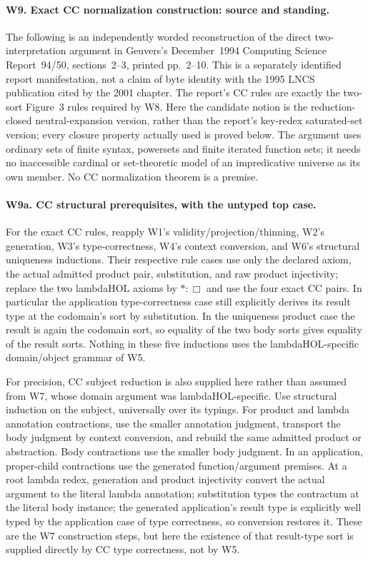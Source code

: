 \paragraph{W9. Exact CC normalization construction: source and standing.}
The following is an independently worded reconstruction of the direct
two-interpretation argument in Geuvers's December~1994 Computing Science
Report~94/50, sections~2--3, printed pp.~2--10. This is a separately
identified report manifestation, not a claim of byte identity with the
1995 LNCS publication cited by the 2001 chapter. The report's CC rules
are exactly the two-sort Figure~3 rules required by W8. Here the
candidate notion is the reduction-closed neutral-expansion version,
rather than the report's key-redex saturated-set version; every closure
property actually used is proved below. The argument uses ordinary sets
of finite syntax, powersets and finite iterated function sets; it needs
no inaccessible cardinal or set-theoretic model of an impredicative
universe as its own member. No CC normalization theorem is a premise.

\paragraph{W9a. CC structural prerequisites, with the untyped top case.}
For the exact CC rules, reapply W1's validity/projection/thinning,
W2's generation, W3's type-correctness, W4's context conversion, and
W6's structural uniqueness inductions. Their respective rule cases use
only the declared axiom, the actual admitted product pair, substitution,
and raw product injectivity; replace the two lambdaHOL axioms by
\(\ast:\Box\) and use the four exact CC pairs. In particular the
application type-correctness case still explicitly derives its result
type at the codomain's sort by substitution. In the uniqueness product
case the result is again the codomain sort, so equality of the two body
sorts gives equality of the result sorts. Nothing in these five inductions
uses the lambdaHOL-specific domain/object grammar of W5.

For precision, CC subject reduction is also supplied here rather than
assumed from W7, whose domain argument was lambdaHOL-specific.
Use structural induction on the subject, universally over its typings.
For product and lambda annotation contractions, use the smaller
annotation judgment, transport the body judgment by context conversion,
and rebuild the same admitted product or abstraction. Body contractions
use the smaller body judgment. In an application, proper-child contractions
use the generated function/argument premises. At a root lambda redex,
generation and product injectivity convert the actual argument to the
literal lambda annotation; substitution types the contractum at the
literal body instance; the generated application's result type is
explicitly well typed by the application case of type correctness, so
conversion restores it. These are the W7 construction steps, but here
the existence of that result-type sort is supplied directly by CC type
correctness, not by W5.

